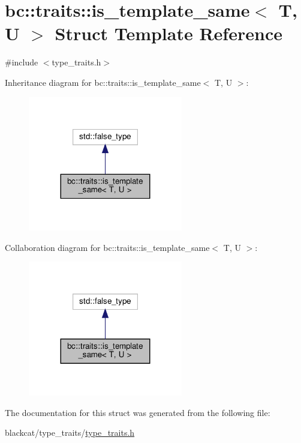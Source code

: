 \hypertarget{structbc_1_1traits_1_1is__template__same}{}\section{bc\+:\+:traits\+:\+:is\+\_\+template\+\_\+same$<$ T, U $>$ Struct Template Reference}
\label{structbc_1_1traits_1_1is__template__same}


{\ttfamily \#include $<$type\+\_\+traits.\+h$>$}



Inheritance diagram for bc\+:\+:traits\+:\+:is\+\_\+template\+\_\+same$<$ T, U $>$\+:\nopagebreak
\begin{figure}[H]
\begin{center}
\leavevmode
\includegraphics[width=191pt]{structbc_1_1traits_1_1is__template__same__inherit__graph}
\end{center}
\end{figure}


Collaboration diagram for bc\+:\+:traits\+:\+:is\+\_\+template\+\_\+same$<$ T, U $>$\+:\nopagebreak
\begin{figure}[H]
\begin{center}
\leavevmode
\includegraphics[width=191pt]{structbc_1_1traits_1_1is__template__same__coll__graph}
\end{center}
\end{figure}


The documentation for this struct was generated from the following file\+:\begin{DoxyCompactItemize}
\item 
blackcat/type\+\_\+traits/\hyperlink{type__traits_2type__traits_8h}{type\+\_\+traits.\+h}\end{DoxyCompactItemize}
